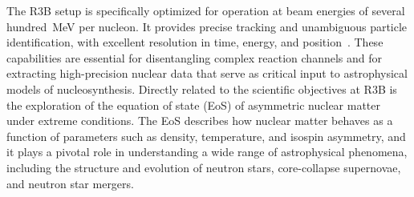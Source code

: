 The R3B setup is specifically optimized for operation at beam energies of several hundred~MeV per nucleon. It provides precise tracking and unambiguous particle identification, with excellent resolution in time, energy, and position~\cite{heil2022new}. These capabilities are essential for disentangling complex reaction channels and for extracting high-precision nuclear data that serve as critical input to astrophysical models of nucleosynthesis.\newline
Directly related to the scientific objectives at R3B is the exploration of the equation of state (EoS) of asymmetric nuclear matter under extreme conditions. The EoS describes how nuclear matter behaves as a function of parameters such as density, temperature, and isospin asymmetry, and it plays a pivotal role in understanding a wide range of astrophysical phenomena, including the structure and evolution of neutron stars, core-collapse supernovae, and neutron star mergers.






